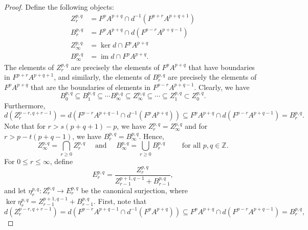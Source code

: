 \documentclass[11pt]{article}
\theoremstyle{thmstyle}
\theoremstyle{defstyle}
\newcommand{\Z}{\mathbb{Z}}
\newcommand{\im}{\operatorname{im}}
\renewcommand{\le}{\leqslant}
\renewcommand{\ge}{\geqslant}
\begin{document}
\begin{proof}
    Define the following objects: 
    \begin{align*}
        Z^{p, q}_r &= F^p A^{p + q}\cap d^{-1}\left(F^{p + r}A^{p + q + 1}\right)\\
        B^{p , q}_r &= F^p A^{p + q}\cap d\left(F^{p - r}A^{p + q - 1}\right)\\
        Z^{p, q}_\infty &= \ker d\cap F^p A^{p + q}\\
        B^{p, q}_\infty &= \im d\cap F^p A^{p + q}.
    \end{align*}
    The elements of $Z^{p, q}_r$ are precisely the elements of $F^pA^{p + q}$ that have boundaries in $F^{p + r}A^{p + q + 1}$, and similarly, the elements of $B^{p, q}_r$ are precisely the elements of $F^p A^{p + q}$ that are the boundaries of elements in $F^{p - r}A^{p + q - 1}$. Clearly, we have 
    \begin{equation*}
        B^{p, q}_0\subseteq B^{p, q}_1\subseteq\cdots B^{p, q}_\infty\subseteq Z^{p, q}_\infty\subseteq\cdots\subseteq Z^{p, q}_1\subset Z^{p, q}_0.
    \end{equation*}
    Furthermore, 
    \begin{equation*}
        d\left(Z^{p - r, q + r - 1}_r\right) = d\left(F^{p - r}A^{p + q - 1}\cap d^{-1}\left(F^p A^{p + q}\right)\right)\subseteq F^pA^{p + q}\cap d\left(F^{p - r}A^{p + q - 1}\right) = B^{p, q}_r.
    \end{equation*}
    Note that for $r > s(p + q + 1) - p$, we have $Z^{p, q}_r = Z^{p, q}_\infty$ and for $r > p - t(p + q - 1)$, we have $B^{p, q}_r = B^{p, q}_\infty$. Hence, 
    \begin{equation*}
        Z^{p, q}_\infty = \bigcap_{r\ge 0} Z^{p, q}_r \quad\text{ and }\quad B^{p, q}_\infty = \bigcup_{r\ge 0}B^{p, q}_r\qquad\text{ for all }p,q\in\Z.
    \end{equation*}
    For $0\le r\le\infty$, define 
    \begin{equation*}
        E^{p, q}_r = \frac{Z^{p, q}_r}{Z^{p + 1, q - 1}_{r - 1} + B^{p, q}_{r - 1}},
    \end{equation*}
    and let $\eta^{p, q}_r\colon Z^{p, q}_r \to E^{p, q}_r$ be the canonical surjection, where $\ker\eta^{p, q}_r = Z^{p + 1, q - 1}_{r - 1} + B^{p, q}_{r - 1}$. First, note that 
    \begin{equation*}
        d\left(Z^{p - r, q + r - 1}_r\right) = d\left(F^{p - r}A^{p + q - 1}\cap d^{-1}\left(F^p A^{p + q}\right)\right)\subseteq F^p A^{p + q}\cap d\left(F^{p - r}A^{p + q - 1}\right) = B^{p, q}_r,

\end{equation*}
\end{proof}
\end{document}
